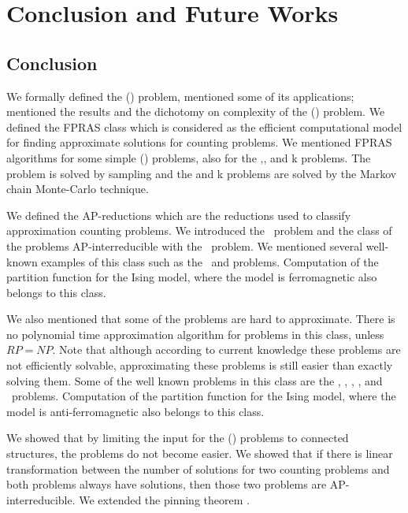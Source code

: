\chapter{Conclusion and Future Works}
\section{Conclusion}
We formally defined the \ccsp(\mrelset) problem, mentioned some of its applications; mentioned the 
results and the dichotomy on complexity of the \ccsp(\mrelset) problem. We defined the
FPRAS class which is considered as the efficient computational model for finding approximate solutions
for counting problems.
We mentioned FPRAS algorithms for some simple \ccsp(\mrelset) problems, also 
for the ,, and k problems.
The  problem is solved by sampling and the  and k problems are solved by the Markov chain Monte-Carlo technique. 

We defined the AP-reductions which are the reductions used to classify approximation
counting problems.
We introduced the \cbis\ problem and the class of the problems AP-interreducible with the \cbis\ problem.
We mentioned several well-known examples of this class such as
the \cdsp\ and  problems. Computation of the partition function for 
the Ising model, where the model is ferromagnetic also belongs to this class.

We also mentioned that some of the problems are hard to approximate. There is
no polynomial time approximation algorithm for problems in this class, unless \(RP=NP\)\@.
Note that although according to current knowledge these problems are not efficiently solvable,
approximating these problems is still easier than exactly solving them.
Some of the well known problems in this 
class are the \cdsat, \ctsat, \csat, \cisp, and \ctcol\ problems. Computation of the partition function for 
the Ising model, where the model is anti-ferromagnetic also belongs to this class.

We showed that by limiting the input for the \ccsp(\mrelset) problems to connected structures,
the problems do not become easier. We showed that if there is linear transformation 
between the number of solutions for two counting problems and 
both problems always have solutions, then those two problems are AP-interreducible.
We extended the pinning 
theorem \cite{Trichotomy}\@. 

